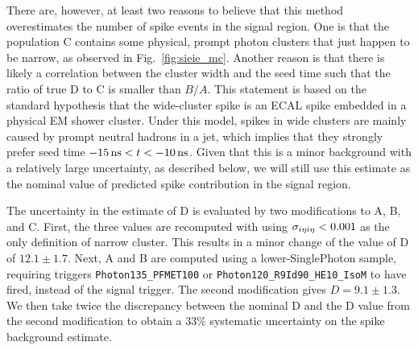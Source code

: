 There are, however, at least two reasons to believe that this method overestimates the number of spike events in the signal region. 
One is that the population C contains some physical, prompt photon clusters that just happen to be narrow, as observed in Fig.~\ref{fig:sieie_mc}. 
Another reason is that there is likely a correlation between the cluster width and the seed time such that the ratio of true D to C is smaller than $B/A$.
This statement is based on the standard hypothesis that the wide-cluster spike is an ECAL spike embedded in a physical EM shower cluster. 
Under this model, spikes in wide clusters are mainly caused by prompt neutral hadrons in a jet, which implies that they strongly prefer seed time $-15\, \text{ns} < t < -10\, \text{ns}$. 
Given that this is a minor background with a relatively large uncertainty, as described below, we will still use this estimate as the nominal value of predicted spike contribution in the signal region.

The uncertainty in the estimate of D is evaluated by two modifications to A, B, and C.
First, the three values are recomputed with using $\sigma_{i\eta i\eta} < 0.001$ as the only definition of narrow cluster. 
This results in a minor change of the value of D of $12.1 \pm 1.7$. Next, A and B are computed using a lower-\pt SinglePhoton sample, requiring triggers \texttt{Photon135\_PFMET100} or \texttt{Photon120\_R9Id90\_HE10\_IsoM} to have fired, instead of the signal trigger. 
The second modification gives $D=9.1 \pm 1.3$. 
We then take twice the discrepancy between the nominal D and the D value from the second modification to obtain a 33\% systematic uncertainty on the spike background estimate.
